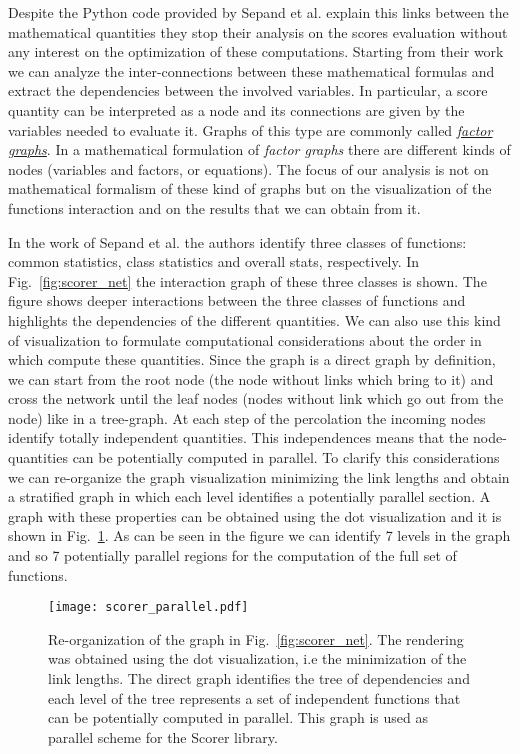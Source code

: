 \documentclass{standalone}
\begin{document}
Despite the Python code provided by Sepand et al. explain this links between the mathematical quantities they stop their analysis on the scores evaluation without any interest on the optimization of these computations.
Starting from their work we can analyze the inter-connections between these mathematical formulas and extract the dependencies between the involved variables.
In particular, a score quantity can be interpreted as a node and its connections are given by the variables needed to evaluate it.
Graphs of this type are commonly called \href{https://en.wikipedia.org/wiki/Factor_graph}{\emph{factor graphs}}.
In a mathematical formulation of \emph{factor graphs} there are different kinds of nodes (variables and factors, or equations).
The focus of our analysis is not on mathematical formalism of these kind of graphs but on the visualization of the functions interaction and on the results that we can obtain from it.

In the work of Sepand et al. the authors identify three classes of functions: common statistics, class statistics and overall stats, respectively.
In Fig.~\ref{fig:scorer_net} the interaction graph of these three classes is shown.
The figure shows deeper interactions between the three classes of functions and highlights the dependencies of the different quantities.
We can also use this kind of visualization to formulate computational considerations about the order in which compute these quantities.
Since the graph is a direct graph by definition, we can start from the root node (the node without links which bring to it) and cross the network until the leaf nodes (nodes without link which go out from the node) like in a tree-graph.
At each step of the percolation the incoming nodes identify totally independent quantities.
This independences means that the node-quantities can be potentially computed in parallel.
To clarify this considerations we can re-organize the graph visualization minimizing the link lengths and obtain a stratified graph in which each level identifies a potentially parallel section.
A graph with these properties can be obtained using the \textsf{dot} visualization and it is shown in Fig.~\ref{fig:scorer_parallel}.
As can be seen in the figure we can identify 7 levels in the graph and so 7 potentially parallel regions for the computation of the full set of functions.

\begin{center}
\begin{figure}[htbp]
\hspace{-2cm}
\texttt{[image: scorer\_parallel.pdf]}
\caption{Re-organization of the graph in Fig.~\ref{fig:scorer_net}.
The rendering was obtained using the \textsf{dot} visualization, i.e the minimization of the link lengths.
The direct graph identifies the tree of dependencies and each level of the tree represents a set of independent functions that can be potentially computed in parallel.
This graph is used as parallel scheme for the \textsf{Scorer} library.
}
\label{fig:scorer_parallel}
\end{figure}
\end{center}
\end{document}
